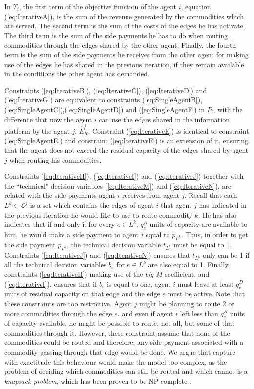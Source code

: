\documentclass{article}
\begin{document}
In $\Upsilon_i$, the first term of the objective function of the agent $i$, equation (\ref{eq:IterativeA}), is the sum of the revenue generated by the commodities which are served. The second term is the sum of the costs of the edges he has activate. The third term is the sum of the side payments he has to do when routing commodities through the edges shared by the other agent. Finally, the fourth term is the sum of the side payments he receives from the other agent for making use of the edges he has shared in the previous iteration, if they remain available in the conditions the other agent has demanded.

Constraints (\ref{eq:IterativeB}), (\ref{eq:IterativeC}), (\ref{eq:IterativeD}) and (\ref{eq:IterativeG}) are equivalent to constraints (\ref{eq:SingleAgentB}),(\ref{eq:SingleAgentC}),(\ref{eq:SingleAgentD}) and (\ref{eq:SingleAgentF}) in $P_i$, with the difference that now the agent $i$ can use the edges shared in the information platform by the agent $j$, $\widehat{E}_R^j$. Constraint (\ref{eq:IterativeE}) is identical to constraint (\ref{eq:SingleAgentE}) and constraint (\ref{eq:IterativeF}) is an extension of it, ensuring that the agent does not exceed the residual capacity of the edges shared by agent $j$ when routing his commodities.

Constraints (\ref{eq:IterativeH}),  (\ref{eq:IterativeI}) and (\ref{eq:IterativeJ}) together with the ``technical" decision variables (\ref{eq:IterativeM}) and (\ref{eq:IterativeN}), are related with the side payments agent $i$ receives from agent $j$. Recall that each $L^k \in \mathcal{L}^j$ is a set which contains the edges of agent $i$ that agent $j$ has indicated in the previous iteration he would like to use to route commodity $k$. He has also indicates that if and only if for every $e \in L^k$, $q_e^R$ units of capacity are available to him, he would make a side payment to agent $i$ equal to $p_{L^k}$. Thus, in order to get the side payment $p_{L^k}$, the technical decision variable $t_{L^k}$ must be equal to 1. Constraints (\ref{eq:IterativeJ}) and (\ref{eq:IterativeN}) ensures that $t_{L^k}$ only can be 1 if all the technical decision variables $b_e$ for $e \in L^k$ are also equal to 1. Finally, constraints (\ref{eq:IterativeH})  making use of the \emph{big M} coefficient, and (\ref{eq:IterativeI}), ensures that if $b_e$ is equal to one, agent $i$ must leave at least $q_e^D$ units of residual capacity on that edge and the edge $e$ must be active. Note that these constraints are too restrictive. Agent $j$ might be planning to route 2 or more commodities through the edge $e$, and even if agent $i$ left less than $q_e^R$ units of capacity available, he might be possible to route, not all, but some of that commodities through it. However, these constraint assume that none of the commodities could be routed and therefore, any side payment associated with a commodity passing through that edge would be done. We argue that capture with exactitude this behaviour would make the model too complex, as the problem of deciding which commodities can still be routed and which cannot is a \emph{knapsack problem}, which has been proven to be NP-complete \parencite{KARP1972}.
\end{document}
